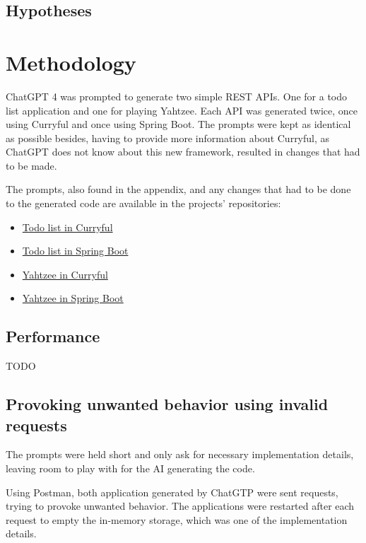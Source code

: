 \documentclass[a4paper]{article}
\begin{document}
\subsection{Hypotheses}

\section{Methodology}


ChatGPT 4 was prompted to generate two simple REST APIs. One for a todo list
application and one for playing Yahtzee. Each API was generated twice, once
using Curryful and once using Spring Boot. The prompts were kept as identical as
possible besides, having to provide more information about Curryful, as ChatGPT
does not know about this new framework, resulted in changes that had to be made.

The prompts, also found in the appendix, and any changes that had to
be done to the generated code are available in the projects' repositories:
\begin{itemize}
	\item \hyperlink{https://github.com/lerchl/curryful-bachelor-thesis-curryful-todo-list}{Todo list in Curryful}
	\item \hyperlink{https://github.com/lerchl/curryful-bachelor-thesis-spring-boot-todo-list}{Todo list in Spring Boot}
	\item \hyperlink{https://github.com/lerchl/curryful-bachelor-thesis-curryful-yahtzee}{Yahtzee in Curryful}
	\item \hyperlink{https://github.com/lerchl/curryful-bachelor-thesis-spring-boot-yahtzee}{Yahtzee in Spring Boot}
\end{itemize}

\subsection{Performance}
TODO

\subsection{Provoking unwanted behavior using invalid requests}
The prompts were held short and only ask for necessary implementation details,
leaving room to play with for the AI generating the code.

Using Postman, both application generated by ChatGTP were sent requests, trying
to provoke unwanted behavior. The applications were restarted after each request
to empty the in-memory storage, which was one of the implementation details.
\end{document}
